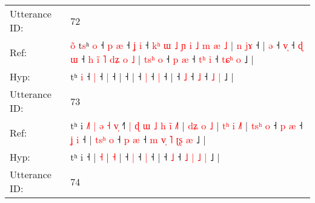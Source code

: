 \documentclass[10pt]{article}
\DeclareRobustCommand{\hl}[1]{{\textcolor{red}{#1}}}
\begin{document}
\begin{longtable}{ll}
 \\
\midrule
Utterance ID: & 72 \\
Ref: & \hl{o}\hl{̃}\hl{ }t\hl{s}ʰ \hl{o} ˧\hl{ }\hl{p} \hl{æ} ˧\hl{ }\hl{ʝ} \hl{i} ˧\hl{ }\hl{k}\hl{ʰ}\hl{ }\hl{ɯ}\hl{ }\hl{˩}\hl{ }\hl{ɲ}\hl{ }\hl{i}\hl{ }\hl{˩}\hl{ }\hl{m}\hl{ }\hl{æ}\hl{ }\hl{˩} |\hl{ }\hl{n}\hl{ }\hl{j}\hl{ɤ} ˧ |\hl{ }\hl{ə} ˧ \hl{v}\hl{̩} ˧\hl{ }\hl{ɖ} \hl{ɯ} ˧\hl{ }\hl{h}\hl{ }\hl{i}\hl{̃}\hl{ }\hl{˥}\hl{ }\hl{d}\hl{ʑ}\hl{ }\hl{o}\hl{ }\hl{˩} |\hl{ }\hl{t}\hl{s}\hl{ʰ}\hl{ }\hl{o} ˧\hl{ }\hl{p} \hl{æ} ˧\hl{ }\hl{t}\hl{ʰ} \hl{i} ˧ \hl{t}\hl{ɕ}\hl{ʰ} \hl{o} ˩ |
 \\
Hyp: & \hl{}\hl{}\hl{}t\hl{}ʰ \hl{i} ˧\hl{}\hl{} \hl{|} ˧\hl{}\hl{} \hl{|} ˧\hl{}\hl{}\hl{}\hl{}\hl{}\hl{}\hl{}\hl{}\hl{}\hl{}\hl{}\hl{}\hl{}\hl{}\hl{}\hl{}\hl{}\hl{}\hl{} |\hl{}\hl{}\hl{}\hl{}\hl{} ˧ |\hl{}\hl{} ˧ \hl{}\hl{|} ˧\hl{}\hl{} \hl{|} ˧\hl{}\hl{}\hl{}\hl{}\hl{}\hl{}\hl{}\hl{}\hl{}\hl{}\hl{}\hl{}\hl{}\hl{} |\hl{}\hl{}\hl{}\hl{}\hl{}\hl{} ˧\hl{}\hl{} \hl{˩} ˧\hl{}\hl{}\hl{} \hl{˩} ˧ \hl{}\hl{}\hl{˩} \hl{|} ˩ |
 \\
\midrule
Utterance ID: & 73 \\
Ref: & tʰ i\hl{ }\hl{˩}\hl{˥}\hl{ }\hl{|}\hl{ }\hl{ə}\hl{ }\hl{˧}\hl{ }\hl{v}\hl{̩} ˧\hl{˥}\hl{ }\hl{|}\hl{ }\hl{ɖ}\hl{ }\hl{ɯ}\hl{ }\hl{˩}\hl{ }\hl{h}\hl{ }\hl{i}\hl{̃}\hl{ }\hl{˩}\hl{˥} |\hl{ }\hl{d}\hl{ʑ}\hl{ }\hl{o} \hl{˩} |\hl{ }\hl{t}\hl{ʰ}\hl{ }\hl{i} \hl{˩}\hl{˥} |\hl{ }\hl{t}\hl{s}\hl{ʰ}\hl{ }\hl{o} ˧\hl{ }\hl{p} \hl{æ} ˧\hl{ }\hl{ʝ} \hl{i} ˧ |\hl{ }\hl{t}\hl{s}\hl{ʰ}\hl{ }\hl{o} ˧\hl{ }\hl{p} \hl{æ} ˧\hl{ }\hl{m} \hl{v}\hl{̩} \hl{˥} \hl{ʈ}\hl{ʂ} \hl{æ} ˩ |
 \\
Hyp: & tʰ i\hl{}\hl{}\hl{}\hl{}\hl{}\hl{}\hl{}\hl{}\hl{}\hl{}\hl{}\hl{} ˧\hl{}\hl{}\hl{}\hl{}\hl{}\hl{}\hl{}\hl{}\hl{}\hl{}\hl{}\hl{}\hl{}\hl{}\hl{}\hl{}\hl{} |\hl{}\hl{}\hl{}\hl{}\hl{} \hl{˧} |\hl{}\hl{}\hl{}\hl{}\hl{} \hl{}\hl{˧} |\hl{}\hl{}\hl{}\hl{}\hl{}\hl{} ˧\hl{}\hl{} \hl{|} ˧\hl{}\hl{} \hl{|} ˧ |\hl{}\hl{}\hl{}\hl{}\hl{}\hl{} ˧\hl{}\hl{} \hl{˩} ˧\hl{}\hl{} \hl{}\hl{˩} \hl{|} \hl{}\hl{˩} \hl{|} ˩ |
 \\
\midrule
Utterance ID: & 74 \\

\end{longtable}
\end{document}
